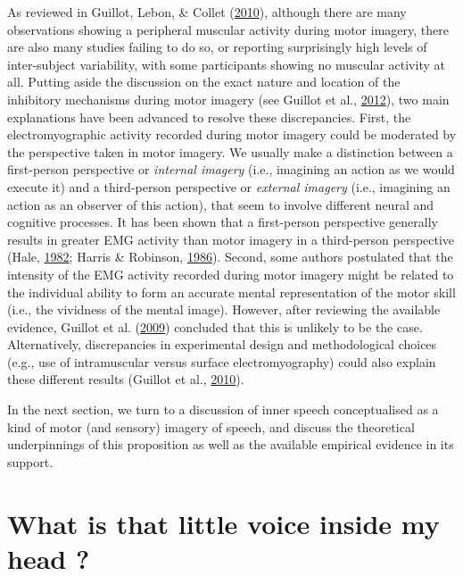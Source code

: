 \documentclass[a4paper,12pt,twoside,openright,oldfontcommands]{memoir}
\begin{document}
As reviewed in Guillot, Lebon, \& Collet
(\protect\hyperlink{ref-guillot_electromyographic_2010}{2010}), although
there are many observations showing a peripheral muscular activity
during motor imagery, there are also many studies failing to do so, or
reporting surprisingly high levels of inter-subject variability, with
some participants showing no muscular activity at all. Putting aside the
discussion on the exact nature and location of the inhibitory mechanisms
during motor imagery (see Guillot et al.,
\protect\hyperlink{ref-guillot_imagining_2012}{2012}), two main
explanations have been advanced to resolve these discrepancies. First,
the electromyographic activity recorded during motor imagery could be
moderated by the perspective taken in motor imagery. We usually make a
distinction between a first-person perspective or \emph{internal
imagery} (i.e., imagining an action as we would execute it) and a
third-person perspective or \emph{external imagery} (i.e., imagining an
action as an observer of this action), that seem to involve different
neural and cognitive processes. It has been shown that a first-person
perspective generally results in greater EMG activity than motor imagery
in a third-person perspective (Hale,
\protect\hyperlink{ref-hale_effects_1982}{1982}; Harris \& Robinson,
\protect\hyperlink{ref-harris_effects_1986}{1986}). Second, some authors
postulated that the intensity of the EMG activity recorded during motor
imagery might be related to the individual ability to form an accurate
mental representation of the motor skill (i.e., the vividness of the
mental image). However, after reviewing the available evidence, Guillot
et al. (\protect\hyperlink{ref-guillot_brain_2009}{2009}) concluded that
this is unlikely to be the case. Alternatively, discrepancies in
experimental design and methodological choices (e.g., use of
intramuscular versus surface electromyography) could also explain these
different results (Guillot et al.,
\protect\hyperlink{ref-guillot_electromyographic_2010}{2010}).

In the next section, we turn to a discussion of inner speech
conceptualised as a kind of motor (and sensory) imagery of speech, and
discuss the theoretical underpinnings of this proposition as well as the
available empirical evidence in its support.

\section{What is that little voice inside my head
?}\label{what-is-that-little-voice-inside-my-head}
\end{document}
